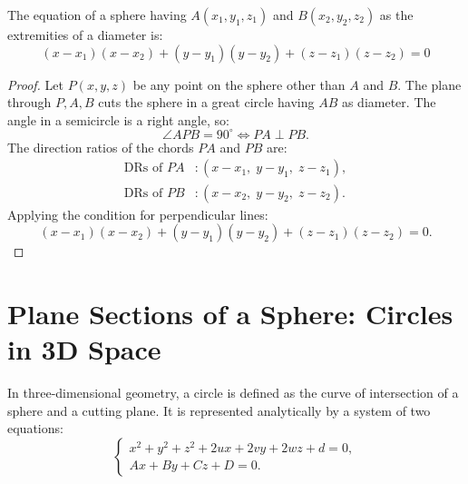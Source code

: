 \begin{theorembox}
The equation of a sphere having $A(x_1, y_1, z_1)$ and $B(x_2, y_2, z_2)$ as the extremities of a diameter is:
\begin{equation}
    \boxed{(x - x_1)(x - x_2) + (y - y_1)(y - y_2) + (z - z_1)(z - z_2) = 0}
\end{equation}
\end{theorembox}

\begin{proof}
Let $P(x, y, z)$ be any point on the sphere other than $A$ and $B$.
The plane through $P, A, B$ cuts the sphere in a great circle having $AB$ as diameter.
The angle in a semicircle is a right angle, so:
\begin{equation}
    \angle APB = 90^\circ \iff PA \perp PB.
\end{equation}
The direction ratios of the chords $PA$ and $PB$ are:
\begin{align}
    \text{DRs of } PA &: (x - x_1, \; y - y_1, \; z - z_1), \\
    \text{DRs of } PB &: (x - x_2, \; y - y_2, \; z - z_2).
\end{align}
Applying the condition for perpendicular lines:
\begin{equation}
    (x - x_1)(x - x_2) + (y - y_1)(y - y_2) + (z - z_1)(z - z_2) = 0.
\end{equation}
\end{proof}

\section{Plane Sections of a Sphere: Circles in 3D Space}

\begin{conceptbox}
In three-dimensional geometry, a circle is defined as the curve of intersection of a sphere and a cutting plane.
It is represented analytically by a system of two equations:
\begin{equation}
    \begin{cases}
        x^2 + y^2 + z^2 + 2ux + 2vy + 2wz + d = 0, \\
        Ax + By + Cz + D = 0.
    \end{cases}
\end{equation}
\end{conceptbox}

